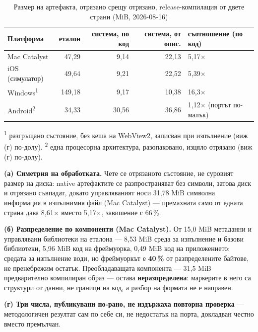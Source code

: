 \begin{table}[H]
\caption{Размер на артефакта, отрязано срещу отрязано, release-компилация от двете страни (MiB, 2026-08-16)}
\label{tab:size}
\centering\small
\begin{tabular}{@{}lrrrl@{}}
\hline
\textbf{Платформа} & \textbf{еталон} & \textbf{система, по код} & \textbf{система, от опис.} & \textbf{съотношение (по код)} \\
\hline
Mac Catalyst        & 47,29  & 9,14  & 22,13 & 5,17$\times$ \\
iOS (симулатор)      & 49,64  & 9,21  & 22,52 & 5,39$\times$ \\
Windows\textsuperscript{1} & 149,18 & 9,17  & 10,38 & 16,3$\times$ \\
Android\textsuperscript{2}  & 34,33  & 30,56 & 36,86 & 1,12$\times$ (портът по-малък) \\
\hline
\end{tabular}
\end{table}

\footnotesize\textsuperscript{1} разгръщано състояние, без кеша на WebView2, записван при
изпълнение (виж (г) по-долу). \textsuperscript{2} една процесорна архитектура, разопаковано, изцяло
отрязано (виж (г) по-долу).\normalsize

\textbf{(а) Симетрия на обработката.} Чете се отрязаното състояние, не суровият размер на диска:
native артефактите се разпространяват без символи, затова диск и отрязано съвпадат, докато
управляваният носи 31{,}78 MiB символна информация в изпълнимия файл (Mac Catalyst) --- премахната
само от едната страна дава 8{,}61$\times$ вместо 5{,}17$\times$, завишение с 66\,\%.

\textbf{(б) Разпределение по компоненти (Mac Catalyst).} От 15,0 MiB метаданни и управлявани
библиотеки на еталона --- 8,53 MiB среда за изпълнение и базови библиотеки, 5,96 MiB код на
фреймуорка, 0,49 MiB код на приложението: средата за изпълнение води, но фреймуоркът е
\textbf{40\,\%} от разпределените байтове, не пренебрежим остатък. Преобладаващата компонента ---
31,5 MiB предварително компилиран образ --- остава \textbf{неразпределена}: маркерите в него са
структури от данни, не граници на код, а разбор на формата не е направен.

\textbf{(г) Три числа, публикувани по-рано, не издържаха повторна проверка} --- методологичен
резултат сам по себе си, не недостатък на порта, докладван честно вместо премълчан.

